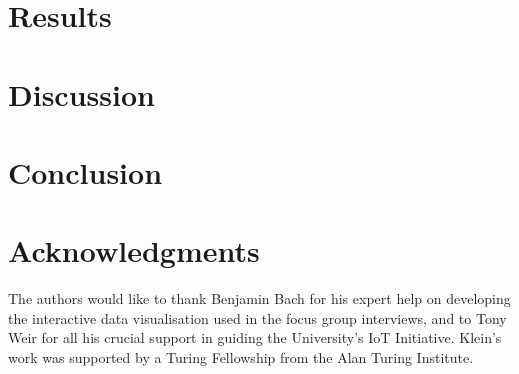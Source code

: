 \documentclass[10pt,twocolumn]{article}
\begin{document}



\section{Results}
\label{sec:results}



\section{Discussion}
\label{sec:discussion}





\section{Conclusion}

\label{sec:conclusion}




\section*{Acknowledgments}


The authors would like to thank Benjamin Bach for his expert help on
developing the interactive data visualisation used in the focus group
interviews, and to Tony Weir for all his crucial support in guiding the University's IoT
Initiative. Klein's work was supported by a Turing Fellowship from the
Alan Turing Institute.


\printbibliography 
\end{document}
